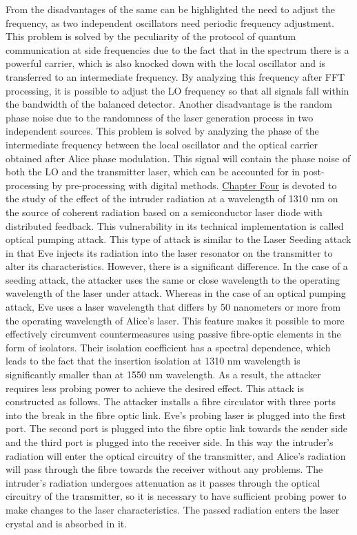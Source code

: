 \newline From the disadvantages of the same can be highlighted the need to adjust the frequency, as two independent oscillators need periodic frequency adjustment. This problem is solved by the peculiarity of the protocol of quantum communication at side frequencies due to the fact that in the spectrum there is a powerful carrier, which is also knocked down with the local oscillator and is transferred to an intermediate frequency. By analyzing this frequency after FFT processing, it is possible to adjust the LO frequency so that all signals fall within the bandwidth of the balanced detector. Another disadvantage is the random phase noise due to the randomness of the laser generation process in two independent sources. This problem is solved by analyzing the phase of the intermediate frequency between the local oscillator and the optical carrier obtained after Alice phase modulation. This signal will contain the phase noise of both the LO and the transmitter laser, which can be accounted for in post-processing by pre-processing with digital methods. 
\underline{Chapter Four} is devoted to the study of the effect of the intruder radiation at a wavelength of 1310 nm on the source of coherent radiation based on a semiconductor laser diode with distributed feedback. This vulnerability in its technical implementation is called optical pumping attack. This type of attack is similar to the Laser Seeding attack in that Eve injects its radiation into the laser resonator on the transmitter to alter its characteristics. However, there is a significant difference. In the case of a seeding attack, the attacker uses the same or close wavelength to the operating wavelength of the laser under attack. Whereas in the case of an optical pumping attack, Eve uses a laser wavelength that differs by 50 nanometers or more from the operating wavelength of Alice's laser. This feature makes it possible to more effectively circumvent countermeasures using passive fibre-optic elements in the form of isolators. Their isolation coefficient has a spectral dependence, which leads to the fact that the insertion isolation at 1310 nm wavelength is significantly smaller than at 1550 nm wavelength. As a result, the attacker requires less probing power to achieve the desired effect. 
\newline This attack is constructed as follows. The attacker installs a fibre circulator with three ports into the break in the fibre optic link. Eve's probing laser is plugged into the first port. The second port is plugged into the fibre optic link towards the sender side and the third port is plugged into the receiver side. In this way the intruder's radiation will enter the optical circuitry of the transmitter, and Alice's radiation will pass through the fibre towards the receiver without any problems. The intruder's radiation undergoes attenuation as it passes through the optical circuitry of the transmitter, so it is necessary to have sufficient probing power to make changes to the laser characteristics. The passed radiation enters the laser crystal and is absorbed in it.
